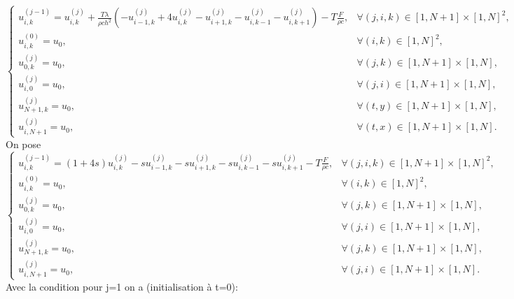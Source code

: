 \documentclass{article}
\begin{document}
\begin{equation}
\begin{cases}
    u_{i,k}^{(j-1)}= u_{i,k}^{(j)} + \frac{T\lambda}{\rho c h^2} \left(-u_{i-1,k}^{(j)} + 4u_{i,k}^{(j)} - u_{i+1,k}^{(j)} - u_{i,k-1}^{(j)} - u_{i,k+1}^{(j)}\right) - T\frac{F}{\rho c}, & \forall (j, i, k) \in [1, N+1] \times [1, N]^2, \\
    u_{i,k}^{(0)} = u_0, & \forall (i, k) \in [1, N]^2, \\
    u_{0,k}^{(j)} = u_0, & \forall (j, k) \in [1, N+1] \times [1, N], \\
    u_{i,0}^{(j)}= u_0, & \forall (j, i) \in [1, N+1] \times [1, N], \\
    u_{N+1,k}^{(j)} = u_0, & \forall (t, y) \in [1, N+1] \times [1, N], \\
    u_{i,N+1}^{(j)} = u_0, & \forall (t, x) \in [1, N+1] \times [1, N].
\end{cases}
\end{equation}
On pose \\
\begin{equation}
\begin{cases}
    u_{i,k}^{(j-1)}= (1+4s)u_{i,k}^{(j)} -su_{i-1,k}^{(j)} - su_{i+1,k}^{(j)} -su_{i,k-1}^{(j)} -su_{i,k+1}^{(j)} - T\frac{F}{\rho c}, & \forall (j, i, k) \in [1, N+1] \times [1, N]^2, \\
    u_{i,k}^{(0)} = u_0, & \forall (i, k) \in [1, N]^2, \\
    u_{0,k}^{(j)} = u_0, & \forall (j, k) \in [1,N+1] \times [1, N], \\
    u_{i,0}^{(j)} = u_0, & \forall (j, i) \in [1,N+1] \times [1, N], \\
    u_{N+1,k}^{(j)} = u_0, & \forall (j, k) \in [1,N+1] \times [1, N], \\
    u_{i,N+1}^{(j)} = u_0, & \forall (j, i) \in [1, N+1] \times [1, N].
\end{cases}
\end{equation}
Avec la condition pour j=1 on a (initialisation à t=0):\\ \\
\end{document}
